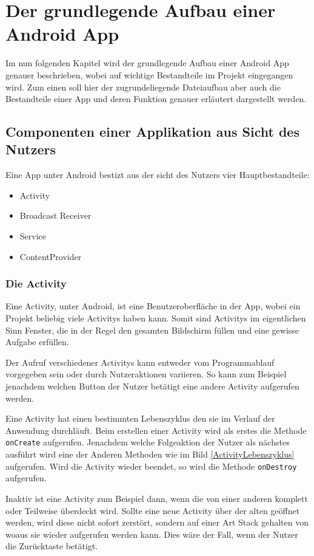 \section{Der grundlegende Aufbau einer Android App}
Im nun folgenden Kapitel wird der grundlegende Aufbau einer Android App genauer beschrieben, wobei auf wichtige Bestandteile im Projekt eingegangen wird.
Zum einen soll hier der zugrundeliegende Dateiaufbau aber auch die Bestandteile einer App und deren Funktion genauer erl\"autert dargestellt werden. \cite{Android44}

\subsection{Componenten einer Applikation aus Sicht des Nutzers}
Eine App unter Android bestizt aus der sicht des Nutzers vier Hauptbestandteile:
\begin{itemize}
 \item Activity
 \item Broadcast Receiver
 \item Service
 \item ContentProvider
\end{itemize}

\subsubsection{Die Activity} \label{Die Activity aus Nutzersicht}
Eine Activity, unter Android, ist eine Benutzeroberfl\"ache in der App, wobei ein Projekt beliebig viele Activitys haben kann. Somit sind Activitys im eigentlichen Sinn Fenster, die in der Regel den gesamten Bildschirm f\"ullen und eine gewisse Aufgabe erf\"ullen. \cite{Kuehn12}

Der Aufruf verschiedener Activitys kann entweder vom Programmablauf vorgegeben sein oder durch Nutzeraktionen variieren. So kann zum Beispiel jenachdem welchen Button der Nutzer bet\"atigt eine andere Activity aufgerufen werden. \cite{Android44}

Eine Activity hat einen bestimmten Lebenszyklus den sie im Verlauf der Anwendung durchl\"auft. Beim erstellen einer Activity wird als erstes die Methode \texttt{onCreate} aufgerufen. Jenachdem welche Folgeaktion der Nutzer als n\"achstes ausf\"uhrt wird eine der Anderen Methoden wie im Bild \ref{ActivityLebenszyklus} aufgerufen. Wird die Activity wieder beendet, so wird die Methode \texttt{onDestroy} aufgerufen. 

Inaktiv ist eine Activity zum Beispiel dann, wenn die von einer anderen komplett oder Teilweise \"uberdeckt wird. Sollte eine neue Activity \"uber der alten ge\"offnet werden, wird diese nicht sofort zerst\"ort, sondern auf einer Art Stack gehalten von woaus sie wieder aufgerufen werden kann. Dies w\"are der Fall, wenn der Nutzer die Zur\"ucktaste bet\"atigt.

